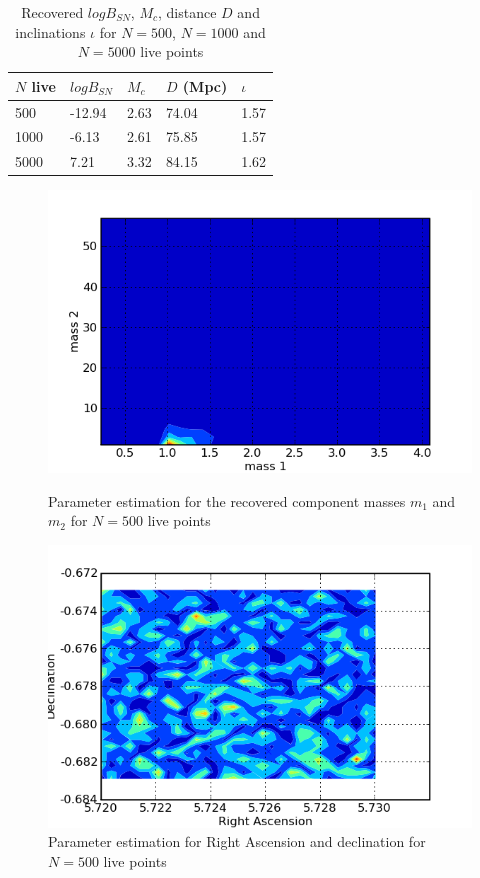 \documentclass[epsf]{article}
\begin{document}
\begin{table}[ht]
 \begin{tabular}{|l|l|l|l|l|}
 \hline
 \hline
 $N$ live & $logB_{SN}$ & $M_c$ & $D$ (Mpc) & $\iota$ \\
 \hline
 \hline
 500 & -12.94 & 2.63 & 74.04 & 1.57 \\
 \hline
 1000 & -6.13 & 2.61 & 75.85 & 1.57 \\
 \hline
 5000 & 7.21 & 3.32 & 84.15 & 1.62 \\
 \hline
 \hline
 \end{tabular} 
 \caption{Recovered $logB_{SN}$, $M_c$, distance $D$ and inclinations $\iota$ for $N=500$, $N=1000$ and $N=5000$ live points}
 \label{Table 7}
\end{table}   

\begin{figure}[ht]
\begin{minipage}[b]{0.5\linewidth}
\centering
\includegraphics[scale=0.40]{m1m2_500.png}
\caption{Parameter estimation for the recovered component masses $m_1$ and $m_2$ for $N=500$ live points}
\label{fig:figure61}
\end{minipage}
\hspace{0.5cm}
\begin{minipage}[b]{0.5\linewidth}
\centering
\includegraphics[scale=0.40]{RAdec_500.png}
\caption{Parameter estimation for Right Ascension and declination for $N=500$ live points}
\label{fig:figure62}
\end{minipage}
\end{figure}
\end{document}
